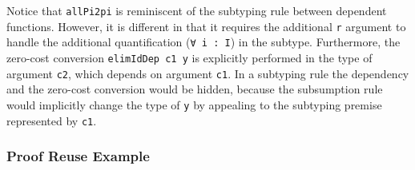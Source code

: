 \documentclass[acmsmall,screen]{acmart}
\begin{document}
Notice that \verb;allPi2pi; is reminiscent of the subtyping rule
between dependent functions. However, it is different in that it
requires the additional \verb;r; argument to handle the additional
quantification (\verb;∀ i : I;) in the subtype. Furthermore, the zero-cost
conversion \verb;elimIdDep c1 y; is explicitly performed in the type of
argument \verb;c2;, which depends on argument \verb;c1;. In a
subtyping rule the dependency and the zero-cost conversion would be
hidden, because the subsumption rule would implicitly change the type of
\verb;y; by appealing to the subtyping premise represented by \verb;c1;.

\subsubsection{Proof Reuse Example}
\end{document}
